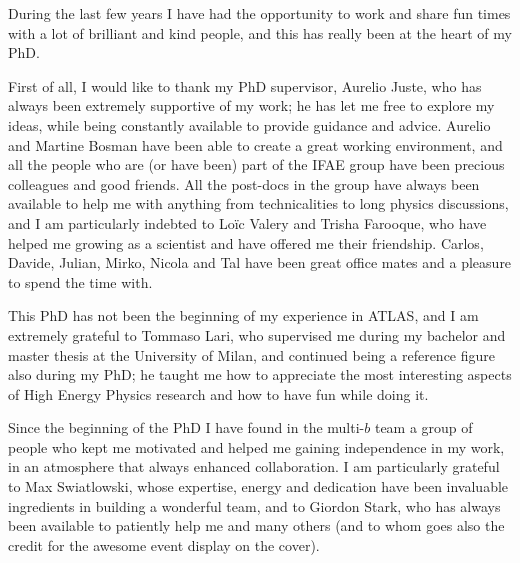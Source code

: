 \par\bigskip  
\par\bigskip

During the last few years I have had the opportunity to work and share fun times with a lot 
of brilliant and kind people, and this has really been at the heart of my PhD. 

\par\medskip 

First of all, I would like to thank my PhD supervisor, Aurelio Juste, who has always been 
extremely supportive of my work; 
he has let me free to explore my ideas, while being constantly available to provide guidance and advice. 
Aurelio and Martine Bosman have been able to create a great working environment, and 
all the people who are (or have been) part of the IFAE group have been precious colleagues and 
good friends.  
All the post-docs in the group have always been available to help me with 
anything from technicalities to long physics discussions, 
and I am particularly indebted to Lo\"ic Valery and Trisha Farooque, who have helped me growing as a scientist and have offered me 
their friendship. 
Carlos, Davide, Julian, Mirko, Nicola and Tal have been great office mates 
and a pleasure to spend the time with. 
 
\par\medskip 

This PhD has not been the beginning of my experience in ATLAS, and I am extremely grateful to 
Tommaso Lari, who supervised me during my bachelor and master thesis at the University of Milan, 
and continued being a reference figure also during my PhD; 
he taught me how to appreciate the most interesting aspects of High Energy Physics research 
and how to have fun while doing it.   

\par\medskip 

Since the beginning of the PhD I have found in the multi-$b$ team a 
group of people who kept me motivated and helped me 
gaining independence in my work, 
in an atmosphere that always enhanced collaboration. %
I am particularly grateful to Max Swiatlowski, whose expertise, energy and dedication have been 
invaluable ingredients in building a wonderful team, 
and to Giordon Stark, who has always been available to patiently help me and many others (and 
to whom goes also the credit for the awesome event display on the cover). 

